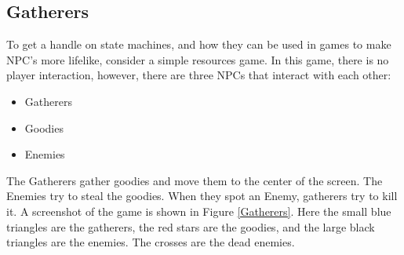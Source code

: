 \subsection{Gatherers}

To get a handle on state machines, and how they can be used
in games to make NPC's more lifelike, consider a simple
resources game.  In this game, there is no player interaction,
however, there are three NPCs that interact with each other:
\begin{itemize}
\item Gatherers
\item Goodies
\item Enemies
\end{itemize}
The Gatherers gather goodies and move them to the center of the
screen.  The Enemies try to steal the goodies.  When they spot an
Enemy, gatherers try to kill it.  A screenshot of the game is shown in
Figure \ref{Gatherers}.  Here the small blue triangles are the
gatherers, the red stars are the goodies, and the large black
triangles are the enemies.  The crosses are the dead enemies.





